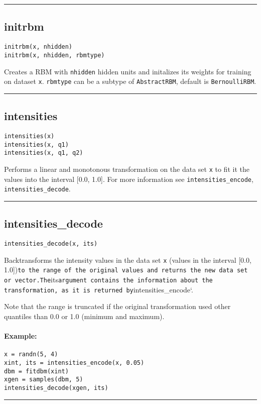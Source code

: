 \noindent\rule{\textwidth}{1pt}
\subsection*{initrbm}  \label{bms_initrbm}
\begin{verbatim}
initrbm(x, nhidden)
initrbm(x, nhidden, rbmtype)
\end{verbatim}
Creates a RBM with \texttt{nhidden} hidden units and initalizes its weights for training on dataset \texttt{x}. \texttt{rbmtype} can be a subtype of \texttt{AbstractRBM}, default is \texttt{BernoulliRBM}.

\noindent\rule{\textwidth}{1pt}
\subsection*{intensities}  \label{bms_intensities}
\begin{verbatim}
intensities(x)
intensities(x, q1)
intensities(x, q1, q2)
\end{verbatim}
Performs a linear and monotonous transformation on the data set \texttt{x} to fit it the values into the interval [0.0, 1.0]. For more information see \texttt{intensities\_encode}, \texttt{intensities\_decode}.

\noindent\rule{\textwidth}{1pt}
\subsection*{intensities\_decode}  \label{bms_intensities_decode}
\begin{verbatim}
intensities_decode(x, its)
\end{verbatim}
Backtransforms the intensity values in the data set \texttt{x} (values in the interval [0.0, 1.0])\texttt{to the range of the original values and returns the new data set or vector.\allowbreak  The}its\texttt{argument contains the information about the transformation, as it is returned by}intensities\_encode`.

Note that the range is truncated if the original transformation used other quantiles than 0.0 or 1.0 (minimum and maximum).

\paragraph*{Example:}
\begin{verbatim}
x = randn(5, 4)
xint, its = intensities_encode(x, 0.05)
dbm = fitdbm(xint)
xgen = samples(dbm, 5)
intensities_decode(xgen, its)
\end{verbatim}
\noindent\rule{\textwidth}{1pt}
